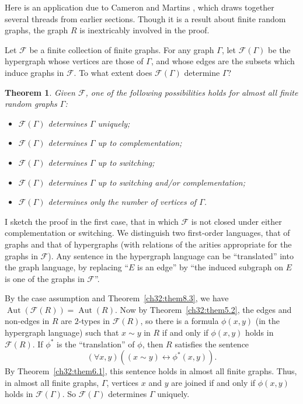 \documentclass{book}
\newtheorem{theorem}{Theorem}
\DeclareMathOperator{\Aut}{Aut}
\begin{document}
Here is an application due to Cameron and Martins
\cite{ch32:bib10}, which draws together several threads from earlier
sections. Though it is a result about finite random graphs, the
graph $R$ is inextricably involved in the proof.

Let $\mathcal{F}$ be a finite collection of finite graphs. For any
graph $\Gamma$, let $\mathcal{F}(\Gamma)$ be the hypergraph whose
vertices are those of $\Gamma$, and whose edges are the subsets
which induce graphs in $\mathcal{F}$. To what extent does
$\mathcal{F}(\Gamma)$ determine $\Gamma$?

\begin{theorem}\label{ch32:them8.4} 
Given $\mathcal{F}$, one of the following
possibilities holds for almost all finite random graphs $\Gamma$:
\begin{itemize}
\item[(a)] $\mathcal{F}(\Gamma)$ determines $\Gamma$ uniquely;
\item[(b)] $\mathcal{F}(\Gamma)$ determines $\Gamma$ up to complementation;
\item[(c)] $\mathcal{F}(\Gamma)$ determines $\Gamma$ up to switching;
\item[(d)] $\mathcal{F}(\Gamma)$ determines $\Gamma$ up to switching and/or complementation;
\item[(e)] $\mathcal{F}(\Gamma)$ determines only the number of vertices of $\Gamma$.
\end{itemize}
\end{theorem}

I sketch the proof in the first case, that in which $\mathcal{F}$ is
not closed under either complementation or switching. We distinguish
two first-order languages, that of graphs and that of hypergraphs
(with relations of the arities appropriate for the graphs in
$\mathcal{F}$). Any sentence in the hypergraph language can be
``translated'' into the graph language, by replacing ``$E$ is an
edge'' by ``the induced subgraph on $E$ is one of the graphs in
$\mathcal{F}$''.

By the case assumption and Theorem~\ref{ch32:them8.3}, we have
$\Aut(\mathcal{F}(R)) = \Aut(R)$. Now by
Theorem~\ref{ch32:them5.2}, the edges and non-edges in $R$ are
$2$-types in $\mathcal{F}(R)$, so there is a formula $\phi(x, y)$ (in
the hypergraph language) such that $x \sim y$ in $R$ if and only if
$\phi(x, y)$ holds in $\mathcal{F}(R)$. If $\phi^{\ast}$ is the
``translation'' of $\phi$, then $R$ satisfies the sentence
\[
(\forall x, y)((x \sim y) \leftrightarrow \phi^{\ast}(x, y)).
\]
By Theorem~\ref{ch32:them6.1}, this sentence holds in almost all
finite graphs. Thus, in almost all finite graphs, $\Gamma$, vertices
$x$ and $y$ are joined if and only if $\phi(x, y)$ holds in
$\mathcal{F}(\Gamma)$. So $\mathcal{F}(\Gamma)$ determines $\Gamma$
uniquely.
\end{document}
